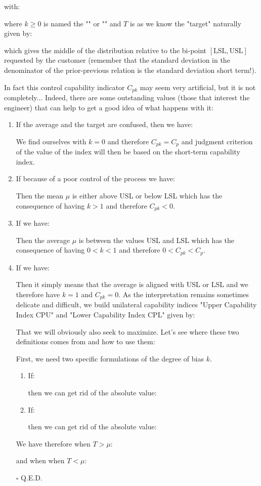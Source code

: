 	with:
	
	where $k\geq 0$ is named the "" or "" and $T$ is as we know the "target" naturally given by:
	
	which gives the middle of the distribution relative to the bi-point $[\text{LSL}, \text{USL}]$ requested by the customer (remember that the standard deviation in the denominator of the prior-previous relation is the standard deviation short term!).
	
	In fact this control capability indicator $C_{pk}$ may seem very artificial, but it is not completely... Indeed, there are some outstanding values (those that interest the engineer) that can help to get a good idea of what happens with it:
	\begin{enumerate}
		\item If the average and the target are confused, then we have:
			
			We find ourselves with $k=0$ and therefore $C_{pk}=C_p$ and judgment criterion of the value of the index will then be based on the short-term capability index.
			\item If because of a poor control of the process we have:
			
			Then the mean $\mu$ is either above USL or below LSL which has the consequence of having $k>1$ and therefore $C_{pk}<0$.	
			\item If we have:
			
			Then the average $\mu$ is between the values USL and LSL which has the consequence of having $0<k<1$ and therefore $0<C_{pk}<C_p$.	
			 \item If we have:
			 
			Then it simply means that the average is aligned with USL or LSL and we therefore have $k=1$ and $C_{pk}=0$.
			As the interpretation remains sometimes delicate and difficult, we build unilateral capability indices "Upper Capability Index CPU" and "Lower Capability Index CPL" given by:
			
			That we will obviously also seek to maximize. Let's see where these two definitions comes from and how to use them:
			\begin{dem}
			First, we need two specific formulations of the degree of bias $k$.
			\begin{enumerate}
				\item If:
				
				then we can get rid of the absolute value:
				
				\item If:
				
				then we can get rid of the absolute value:
				
			\end{enumerate}
	We have therefore when $T>\mu$:
		
		and when when $T<\mu$:
		
		\begin{flushright}
			$\square$  Q.E.D.
		\end{flushright}
		\end{dem}
	\end{enumerate}
